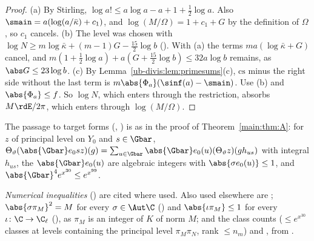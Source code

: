 \begin{proof}
(a) By Stirling, $\log a!\le a\log a-a+1+\frac12\log a$. Also $\smain=a(\log(a/\bar\kappa)+c_1)$,
and $\log(M/\Omega)=1+c_1+G$ by the definition of $\Omega$, so $c_1$ cancels. (b) The level was
chosen with $\log N\ge m\log\bar\kappa+(m-1)G-\frac{15}2\log b$
(). With (a) the terms $ma(\log\bar\kappa+G)$ cancel,
and $m(1+\frac12\log a)+a(G+\frac{15}2\log b)\le32a\log b$ remains, as $\abs G\le23\log b$.
(c) By Lemma~\ref{ub-divis:lem:primesums}(c), $\mathrm{cs}$ minus the right side without the last
term is $m\abs{\Phi_a}(\sinf(a)-\smain)$. Use (b) and $\abs{\Phi_a}\le f$. So $\log N$, which
enters through the restriction, absorbs $M\rdE/2\pi$, which enters through $\log(M/\Omega)$.
\end{proof}

The passage to target forms (,
) is as in the proof of Theorem~\ref{main:thm:A}:
for $z$ of principal level on $Y_0$ and $s\in\Gbar$, $\Theta_\vartheta(\abs{\Gbar}e_0sz)(g)=\sum_{u\in\Gbar}\abs{\Gbar}e_0(u)(\Theta_\vartheta z)(gh_{us})$
with integral $h_{us}$, the $\abs{\Gbar}e_0(u)$ are algebraic integers with $\abs{\sigma e_0(u)}\le1$,
and $\abs{\Gbar}^4e^{x^{30}}\le e^{x^{99}}$.

\emph{Numerical inequalities} () are cited where used.
Also used elsewhere are ; $\abs{\sigma\pi_M}^2=M$ for every
$\sigma\in\Aut\C$ () and $\abs{\iota\pi_M}\le1$ for every
$\iota\colon\C\to\C_\ell$ (), as $\pi_M$ is an integer of $K$
of norm $M$; and the class counts 
($\le e^{x^{30}}$ classes at levels containing the principal level $\pi_M\pi_N$, rank $\le n_m$) and
, from .
